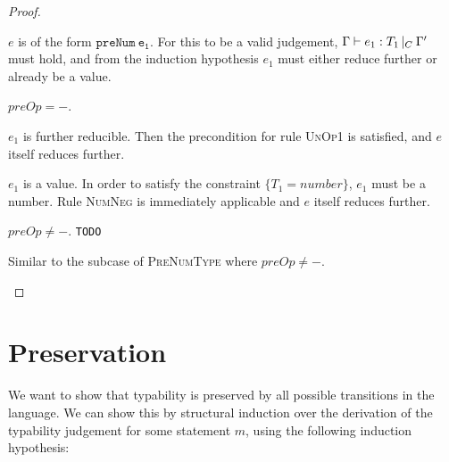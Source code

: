 \documentclass[a4paper]{article}
\theoremstyle{dotless}
\begin{document}
\begin{proof}
  \begin{case}[PreNumType]\label{prenumtype}
	$e$ is of the form $\mathtt{preNum\ e_1}$. For this to be a valid judgement,
	$\Gamma{}\vdash e_1: T_1\,|_C\:\Gamma'$ must hold, and from the induction hypothesis $e_1$ must
	either reduce further or already be a value.
	\begin{subcase} $preOp=-$. 
	  \begin{subcase}
	  	$e_1$ is further reducible. Then the precondition for rule \textsc{UnOp1}
	  	is satisfied, and $e$ itself reduces further.
	  \end{subcase}
	  \begin{subcase}
	  	$e_1$ is a value. In order to satisfy the constraint $\{T_1=number\}$,
	  	$e_1$ must be a number. Rule \textsc{NumNeg} is immediately applicable
	  	and $e$ itself reduces further.
	  \end{subcase}
	\end{subcase}
	\begin{subcase} $preOp\neq-$. 
	  \texttt{TODO}
	\end{subcase}
  \end{case}

  \begin{case}[PostOpType]\label{postoptype}
  	Similar to the subcase of \textsc{PreNumType} where $preOp\neq-$.
  \end{case}

\end{proof}



\section*{Preservation}

We want to show that typability is preserved by all possible transitions
in the language. We can show this by structural induction over the
derivation of the typability judgement for some statement $m$, using the
following induction hypothesis:
\end{document}
